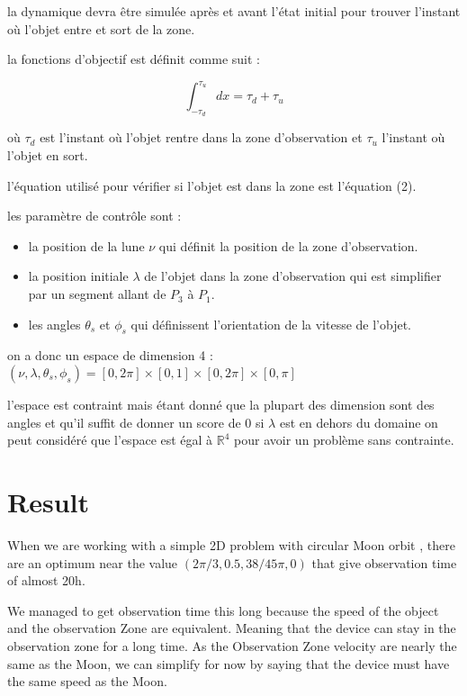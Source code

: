 \documentclass{article} %
\begin{document}
		la dynamique devra être simulée après et avant l'état initial pour trouver l'instant où l'objet entre et sort de la zone.
		
		la fonctions d'objectif est définit comme suit :
		
		$$
		\int_{-\tau_d}^{\tau_u}dx=\tau_d+\tau_u
		$$
		
		où $\tau_d$ est l'instant où l'objet rentre dans la zone d'observation et $\tau_u$ l'instant où l'objet en sort.
		
		l'équation utilisé pour vérifier si l'objet est dans la zone est l'équation (2).
		
		les paramètre de contrôle sont :
		
		\begin{itemize}
			\item la position de la lune $\nu$ qui définit la position de la zone d'observation.
			\item la position initiale $\lambda$ de l'objet dans la zone d'observation qui est simplifier par un segment allant de $P_3$ à $P_1$. 
			\item les angles $\theta_s$ et $\phi_s$ qui définissent l'orientation de la vitesse de l'objet.
		\end{itemize}
		
		on a donc un espace de dimension 4 :
		$(\nu,\lambda,\theta_s,\phi_s)=[0,2\pi]\times[0,1]\times[0,2\pi]\times[0,\pi]$
		
		l'espace est contraint mais étant donné que la plupart des dimension sont des angles et qu'il suffit de donner un score de 0 si $\lambda$ est en dehors du domaine on peut considéré que l'espace est égal à $\mathbb{R}^4$ pour avoir un problème sans contrainte.
		
		\section{Result}
			
		When we are working with a simple 2D problem with circular Moon orbit , there are an optimum near the value $(2\pi/3,0.5,38/45\pi,0)$ that give observation time of almost 20h.
		
		We managed to get observation time this long because the speed of the object and the observation Zone are equivalent. Meaning that the device can stay in the observation zone for a long time. As the Observation Zone velocity are nearly the same as the Moon, we can simplify for now by saying that the device must have the same speed as the Moon.
		
\end{document}
